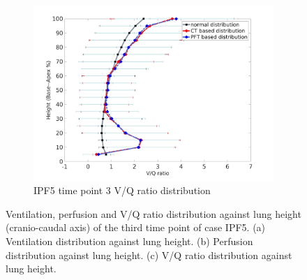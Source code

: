 \begin{figure}[htbp]
\begin{subfigure}{.6\linewidth}
  \includegraphics[width=\linewidth,trim={{.0\wd0} {.0\wd0} {.0\wd0} {.0\wd0}},clip]{Appendix/Image_AppexB/IPF513/IPF513_VQAgainstLungHeight.jpg}
  \caption{IPF5 time point 3 V/Q ratio distribution}
  \label{fig:IPF513VQDistribution-c}
\end{subfigure}
\caption{ Ventilation, perfusion and V/Q ratio distribution against lung height (cranio-caudal axis) of the third time point of case IPF5. (a) Ventilation distribution against lung height. (b) Perfusion distribution against lung height. (c) V/Q ratio distribution against lung height.}
\label{fig:IPF513VQDistribution}
\end{figure}

